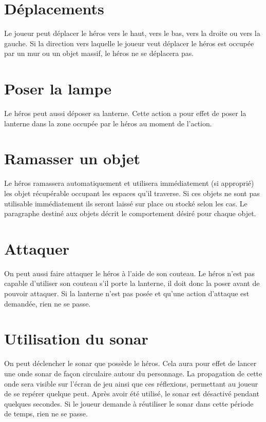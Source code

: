 \documentclass[a4paper, 11pt]{report}
\begin{document}
      \section{Déplacements}
        Le joueur peut déplacer le héros vers le haut, vers le bas, vers la droite ou vers la gauche. Si la 
        direction vers laquelle le joueur veut déplacer le héros est occupée par un mur ou un objet massif, 
        le héros ne se déplacera pas.

      \section{Poser la lampe}
        Le héros peut aussi déposer sa lanterne. Cette action a pour effet de poser la lanterne dans la zone
        occupée par le héros au moment de l'action.
        
      \section{Ramasser un objet}
        Le héros ramassera automatiquement et utilisera immédiatement (si approprié) les objet récupérable
        occupant les espaces qu'il traverse. Si ces objets ne sont pas utilisable immédiatement ils seront
        laissé sur place ou stocké selon les cas. Le paragraphe destiné aux objets décrit le comportement
        désiré pour chaque objet.
        
      \section{Attaquer}
        On peut aussi faire attaquer le héros à l'aide de son couteau. Le héros n'est pas capable d'utiliser son
        couteau s'il porte la lanterne, il doit donc la poser avant de pouvoir attaquer. Si la lanterne n'est pas
        posée et qu'une action d'attaque est demandée, rien ne se passe.
        
      \section{Utilisation du sonar}
        On peut déclencher le sonar que possède le héros. Cela aura pour effet de lancer une onde sonar de
        façon circulaire autour du personnage. La propagation de cette onde sera visible sur l'écran de jeu 
        ainsi que ces réflexions, permettant au joueur de se repérer quelque peut. Après avoir été utilisé, le 
        sonar est désactivé pendant quelques secondes. Si le joueur demande à réutiliser le sonar dans cette
        période de temps, rien ne se passe.
\end{document}
